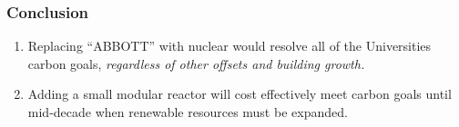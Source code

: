 \begin{frame}
  \frametitle{Conclusion}
  \begin{enumerate}
    \item Replacing ``ABBOTT'' with nuclear would resolve all of the Universities
    carbon goals, \textit{regardless of other offsets and building growth.}
    \item Adding a small modular reactor will cost effectively meet carbon goals
    until mid-decade when renewable resources must be expanded.
  \end{enumerate}
\end{frame}
